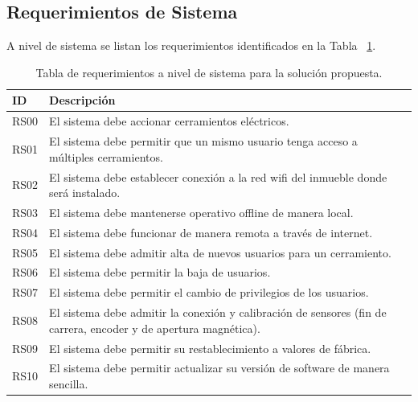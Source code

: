 \subsection{Requerimientos de Sistema}
A nivel de sistema se listan los requerimientos identificados en la Tabla ~\ref{table:req_sistemas}.
\begin{table}[ht]
	\centering
	\begin{tabular}{|l|m{12cm}|}
		\hline
		\textbf{ID} & \textbf{Descripción}                                                                                             \\ \hline
		RS00        & El sistema debe accionar cerramientos eléctricos.                                                                \\ \hline
		RS01        & El sistema debe permitir que un mismo usuario tenga acceso a múltiples cerramientos.                             \\ \hline
		RS02        & El sistema debe establecer conexión a la red wifi del inmueble donde será instalado.                             \\ \hline
		RS03        & El sistema debe mantenerse operativo offline de manera local.                                                    \\ \hline
		RS04        & El sistema debe funcionar de manera remota a través de internet.                                                 \\ \hline
		RS05        & El sistema debe admitir alta de nuevos usuarios para un cerramiento.                                             \\ \hline
		RS06        & El sistema debe permitir la baja de usuarios.                                                                    \\ \hline
		RS07        & El sistema debe permitir el cambio de privilegios de los usuarios.                                               \\ \hline
		RS08        & El sistema debe admitir la conexión y calibración de sensores (fin de carrera, encoder y de apertura magnética). \\ \hline
		RS09        & El sistema debe permitir su restablecimiento a valores de fábrica.                                               \\ \hline
		RS10        & El sistema debe permitir actualizar su versión de software de manera sencilla.                                   \\ \hline
	\end{tabular}
	\caption[Requerimientos de Sistema]{Tabla de requerimientos a nivel de sistema para la solución propuesta.}
	\label{table:req_sistemas}
\end{table}
